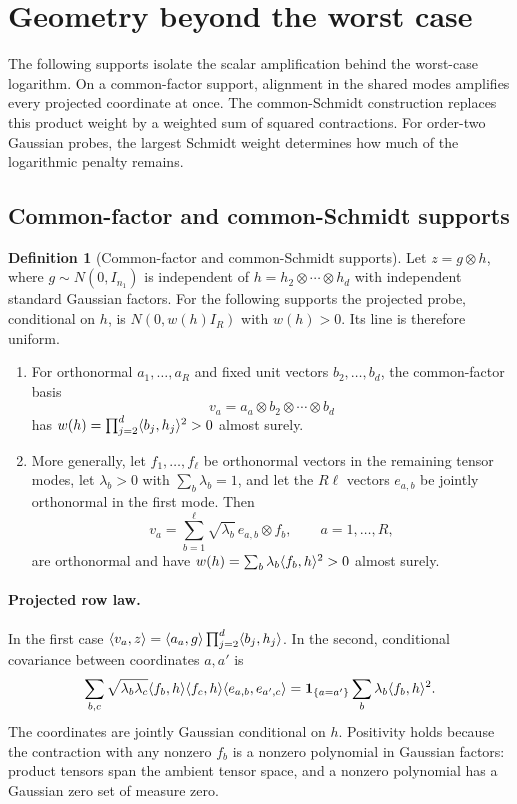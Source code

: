 \documentclass[11pt,a4paper]{article}
\theoremstyle{definition}\newtheorem{definition}[theorem]{Definition}
\theoremstyle{remark}\newtheorem{remark}[theorem]{Remark}
\numberwithin{equation}{section}
\newcommand{\Id}{I}\newcommand{\F}{\mathrm F}
\begin{document}
\section{Geometry beyond the worst case}
\label{geom:subsec:geometry}
The following supports isolate the scalar amplification behind the
worst-case logarithm. On a common-factor support, alignment in the
shared modes amplifies every projected coordinate at once. The
common-Schmidt construction replaces this product weight by a weighted
sum of squared contractions. For order-two Gaussian probes, the largest
Schmidt weight determines how much of the logarithmic penalty remains.

\subsection{Common-factor and common-Schmidt supports}
\begin{definition}[Common-factor and common-Schmidt supports]
\label{exact:prop:supports}
Let $z=g\otimes h$, where $g\sim N(0,\Id_{n_1})$ is independent of
$h=h_2\otimes\cdots\otimes h_d$ with independent standard Gaussian factors.
For the following supports the projected probe, conditional on $h$, is
$N(0,w(h)I_R)$ with $w(h)>0$. Its line is therefore uniform.
\begin{enumerate}
\item For orthonormal $a_1,\ldots,a_R$ and fixed unit vectors
$b_2,\ldots,b_d$, the common-factor basis
\[
 v_a=a_a\otimes b_2\otimes\cdots\otimes b_d
\]
has $w(h)=\prod_{j=2}^d\langle b_j,h_j\rangle^2>0$ almost surely.
\item More generally, let $f_1,\ldots,f_\ell$ be orthonormal vectors in
the remaining tensor modes, let $\lambda_b>0$ with $\sum_b \lambda_b=1$, and let the
$R\ell$ vectors $e_{a,b}$ be jointly orthonormal in the first mode. Then
\[
 v_a=\sum_{b=1}^{\ell}\sqrt{\lambda_b}\,e_{a,b}\otimes f_b,
 \qquad a=1,\ldots,R,
\]
are orthonormal and have
$w(h)=\sum_b \lambda_b\langle f_b,h\rangle^2>0$ almost surely.
\end{enumerate}
\end{definition}
\paragraph{Projected row law.}
In the first case $\langle v_a,z\rangle=\langle a_a,g\rangle\prod_{j=2}^d\langle b_j,h_j\rangle$.
In the second, conditional covariance between coordinates $a,a'$ is
\[
 \sum_{b,c}\sqrt{\lambda_b\lambda_c}\langle f_b,h\rangle\langle f_c,h\rangle
                  \langle e_{a,b},e_{a',c}\rangle
 =\mathbf1_{\{a=a'\}}\sum_b \lambda_b\langle f_b,h\rangle^2.
\]
The coordinates are jointly Gaussian conditional on $h$. Positivity holds
because the contraction with any nonzero $f_b$ is a nonzero polynomial in
Gaussian factors: product tensors span the ambient tensor space, and a
nonzero polynomial has a Gaussian zero set of measure zero.
\end{document}

